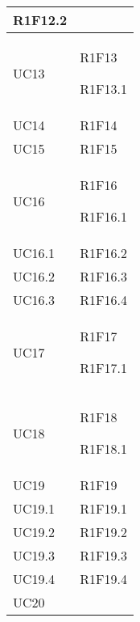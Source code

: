 \begin{center}
\begin{longtable}{|p{44mm}|p{22mm}|}
R1F12.2 \newline
\\
\hline
UC13 &

R1F13 \newline

R1F13.1 \newline
\\
\hline
UC14 &

R1F14 \newline
\\
\hline
UC15 &

R1F15 \newline
\\
\hline
UC16 &

R1F16 \newline

R1F16.1 \newline
\\
\hline
UC16.1 &

R1F16.2 \newline
\\
\hline
UC16.2 &

R1F16.3 \newline
\\
\hline
UC16.3 &

R1F16.4 \newline
\\
\hline
UC17 &

R1F17 \newline

R1F17.1 \newline
\\
\hline
UC18 &

R1F18 \newline

R1F18.1 \newline
\\
\hline
UC19 &

R1F19 \newline
\\
\hline
UC19.1 &

R1F19.1 \newline
\\
\hline
UC19.2 &

R1F19.2 \newline
\\
\hline
UC19.3 &

R1F19.3 \newline
\\
\hline
UC19.4 &

R1F19.4 \newline
\\
\hline
UC20 &


\end{longtable}
\end{center}
